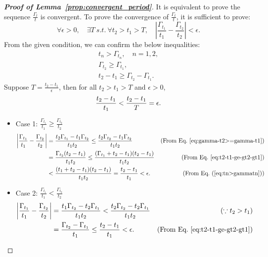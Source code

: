 \documentclass[11pt,a4paper]{article}
\begin{document}
\smallskip
	\begin{proof}[\textbf{Proof of Lemma~\ref{prop:convergent_period}}]
		It is equivalent to prove the sequence $\frac{\Gamma_t}{t}$ is convergent.
		To prove the convergence of $\frac{\Gamma_t}{t}$, it is sufficient to prove:
		\[
			\forall \epsilon>0, \quad\exists T ~s.t.~ \forall t_2>t_1>T,\quad \left\vert \frac{\Gamma_{t_1}}{t_1} - \frac{\Gamma_{t_2}}{t_2} \right\vert < \epsilon.
		\]
		From the given condition, we can confirm the below inequalities:
		\begin{gather}
			t_n > \Gamma_{t_n},\quad n=1,2,\label{eq:tn>gammatn}\\
			\Gamma_{t_2} \ge \Gamma_{t_1}, \label{eq:gamma-t2>=gamma-t1}\\
			t_2-t_1 \ge \Gamma_{t_2} - \Gamma_{t_1}.\label{eq:t2-t1-ge-gt2-gt1}
		\end{gather}
		Suppose $T=\frac{t_2 - t_1}{\epsilon}$, then for all $t_2>t_1>T$ and $\epsilon >0$, 
		\begin{eqnarray}%
			\frac{t_2-t_1}{t_1}< \frac{t_2 - t_1 }{T} = \epsilon. \notag
		\end{eqnarray}

		\begin{itemize}
		\item[$\bullet$] Case 1: $\frac{\Gamma_{t_1}}{t_1} \ge \frac{\Gamma_{t_2}}{t_2}$
		\begin{align}
			\left\vert \frac{\Gamma_{t_1}}{t_1} - \frac{\Gamma_{t_2}}{t_2} \right\vert &= \frac{t_2\Gamma_{t_1}-t_1\Gamma_{t_2}}{t_1t_2}\le \frac{t_2\Gamma_{t_2}-t_1\Gamma_{t_2}}{t_1t_2} &\text{(From Eq.~\eqref{eq:gamma-t2>=gamma-t1})}\notag\\
			&=\frac{\Gamma_{t_2}(t_2 - t_1)}{t_1t_2} \le \frac{(\Gamma_{t_1}+t_2-t_1)(t_2-t_1)}{t_1t_2}&\text{(From Eq.~\eqref{eq:t2-t1-ge-gt2-gt1})}\notag\\
			&<\frac{(t_1+t_2-t_1)(t_2-t_1)}{t_1t_2}=\frac{t_2-t_1}{t_1}<\epsilon. &\text{(From Eq.~(\ref{eq:tn>gammatn}))}\notag
		\end{align}
		\item[$\bullet$] Case 2: $\frac{\Gamma_{t_1}}{t_1} < \frac{\Gamma_{t_2}}{t_2}$
		\begin{align}
			\left\vert \frac{\Gamma_{t_1}}{t_1} - \frac{\Gamma_{t_2}}{t_2} \right\vert &= \frac{t_1\Gamma_{t_2}-t_2\Gamma_{t_1}}{t_1t_2} < \frac{t_2\Gamma_{t_2}-t_2\Gamma_{t_1}}{t_1t_2} & (\because t_2 > t_1)\notag\\
			&=\frac{\Gamma_{t_2}-\Gamma_{t_1}}{t_1} \le \frac{t_2-t_1}{t_1}<\epsilon. &\text{(From Eq.~\eqref{eq:t2-t1-ge-gt2-gt1})}\notag
		\end{align}
		\end{itemize}
		
	\end{proof}
\end{document}
